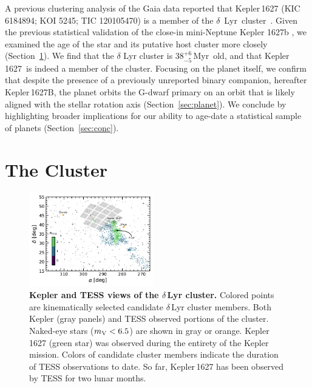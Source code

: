 \documentclass[12pt,modern,twocolumn,tighten]{aastex63}
\newcommand{\cn}{$\delta$\ Lyr\ cluster} %
\newcommand{\sn}{Kepler\,1627} %
\newcommand{\clusterage}{$38^{+6}_{-5}$\,Myr} %
\begin{document}
A previous clustering analysis of the Gaia data reported that
Kepler\,1627 (KIC 6184894; KOI 5245; TIC 120105470) is a member of the
\cn\ \citep{kounkel_untangling_2019}.  Given the previous statistical
validation of the close-in mini-Neptune Kepler 1627b
\citep{2012ApJS..199...24T,morton_false_2016,thompson_planetary_2018},
we examined the age of the star and its putative host cluster more
closely (Section~\ref{sec:cluster}).  We find that the $\delta$ Lyr
cluster is \clusterage\ old, and that \sn\ is indeed a member of the
cluster.  Focusing on the planet itself, we confirm that despite the
presence of a previously unreported binary companion, hereafter
Kepler\,1627B, the planet orbits the G-dwarf primary on an orbit that
is likely aligned with the stellar rotation axis
(Section~\ref{sec:planet}).  We conclude by highlighting broader
implications for our ability to age-date a statistical sample of
planets (Section~\ref{sec:conc}).


\section{The Cluster}
\label{sec:cluster}

\begin{figure}[t]
	\begin{center}
		\leavevmode
		\includegraphics[width=0.48\textwidth]{f2.pdf}
	\end{center}
	\vspace{-0.7cm}
	\caption{
    {\bf Kepler and TESS views of the $\delta$\,Lyr cluster.} Colored
    points are kinematically selected candidate $\delta$\,Lyr
    cluster members.  Both Kepler (gray panels) and TESS observed portions of
    the cluster.  Naked-eye stars ($m_{\rm V}<6.5$) are shown in gray or orange.
    Kepler\,1627 (green star) was observed during the entirety of the
    Kepler mission.  Colors of candidate cluster members indicate the
    duration of TESS observations to date.  So far, Kepler\,1627 has been
    observed by TESS for two lunar months.
    \label{fig:skychart}
	}
\end{figure}
\end{document}
